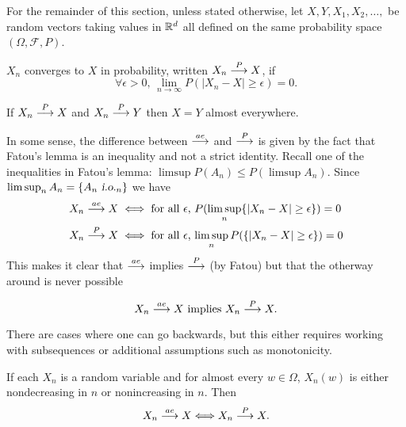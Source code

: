 \begin{sectionassumption} For the remainder of this section, unless stated otherwise, let $X, Y, X_1, X_2, \ldots, $  be random vectors taking values in $\Bbb R^d$ all defined on the same probability space   $(\Omega, \mathcal F, P)$.
\end{sectionassumption}




\begin{definition}
 $X_n$ converges to $X$ in probability, written $X_n\overset{\small P} \longrightarrow X$, if
\[\forall \epsilon>0,\, \lim_{n\rightarrow\infty} P(|X_n-X|\geq \epsilon)=0. \]
\end{definition}


\begin{theorem}
If $X_n\overset{\small P} \longrightarrow X$ and  $X_n\overset{\small P} \longrightarrow Y$ then  $X=Y$  almost everywhere.
\end{theorem}



In some sense, the difference between $\overset{\small ae} \longrightarrow$ and $\overset{\small P} \longrightarrow$ is given by the fact that Fatou's lemma is an inequality and not a strict identity. Recall one of the inequalities in Fatou's lemma: $\limsup P(A_n) \leq P(\limsup A_n)$. Since $\limsup_n A_n = \{A_n {\,\,\text{\sl i.o.} }_n \}$ we have
\begin{align*}
X_n \overset{\small ae} \longrightarrow X &\iff \text{for all $\epsilon$, $P(\limsup_n \{|X_n-X|\geq \epsilon\}) = 0$}\\
X_n \overset{\small P} \longrightarrow X &\iff \text{for all $\epsilon$, $\limsup_n  P(\{|X_n-X|\geq \epsilon\}) = 0$}
\end{align*}
This makes it clear that $\overset{\small ae} \longrightarrow$  implies $\overset{\small P} \longrightarrow$ (by Fatou) but that the otherway around is never possible



\begin{theorem}[{\bf $ae$ implies $P$}]
\begin{equation}
X_n\overset{\small ae} \longrightarrow X
\text{ implies } X_n \overset{\small P} \longrightarrow X.
\end{equation}
\end{theorem}


There are cases where one can go backwards, but this either requires working with subsequences or additional assumptions such as monotonicity.



\begin{theorem}
If each $X_n$ is a random variable and for almost every $w\in\Omega$, $X_n(w)$ is either nondecreasing in $n$ or nonincreasing in $n$. Then
\[ X_n \overset{\small ae} \longrightarrow X \Longleftrightarrow  X_n \overset{\small P} \longrightarrow X.\]
\end{theorem}






